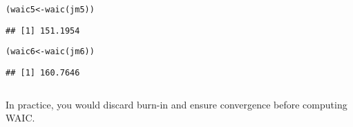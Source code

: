 \documentclass[color=usenames,dvipsnames]{beamer}\usepackage[]{graphicx}\usepackage[]{xcolor}
\makeatletter
\newcommand{\hldef}[1]{\textcolor[rgb]{0,0,0}{#1}}%
\newcommand{\hlkwb}[1]{\textcolor[rgb]{0,0.341,0.682}{#1}}%
\newcommand{\hlkwd}[1]{\textcolor[rgb]{0.004,0.004,0.506}{#1}}%
\newenvironment{kframe}{%
 \def\at@end@of@kframe{}%
 \ifinner\ifhmode%
  \def\at@end@of@kframe{\end{minipage}}%
  \begin{minipage}{\columnwidth}%
 \fi\fi%
 \def\FrameCommand##1{\hskip\@totalleftmargin \hskip-\fboxsep
 \colorbox{shadecolor}{##1}\hskip-\fboxsep
     \hskip-\linewidth \hskip-\@totalleftmargin \hskip\columnwidth}%
 \MakeFramed {\advance\hsize-\width
   \@totalleftmargin\z@ \linewidth\hsize
   \@setminipage}}%
 {\par\unskip\endMakeFramed%
 \at@end@of@kframe}
\newenvironment{knitrout}{}{} %
\makeatother
\begin{document}
\begin{frame}[fragile]
\begin{columns}
\begin{column}{0.5\textwidth}
\begin{knitrout}
\end{knitrout}
\begin{knitrout}\scriptsize
{}\color{fgcolor}\begin{kframe}
\begin{alltt}
\hldef{(waic5} \hlkwb{<-} \hlkwd{waic}\hldef{(jm5))}
\end{alltt}
\begin{verbatim}
## [1] 151.1954
\end{verbatim}
\end{kframe}
\end{knitrout}
\begin{knitrout}\scriptsize
{}\color{fgcolor}\begin{kframe}
\begin{alltt}
\hldef{(waic6} \hlkwb{<-} \hlkwd{waic}\hldef{(jm6))}
\end{alltt}
\begin{verbatim}
## [1] 160.7646
\end{verbatim}
\end{kframe}
\end{knitrout}
    \end{column}
  \end{columns}
  \pause
  \vfill
  In practice, you would discard burn-in and ensure convergence before
  computing WAIC.
\end{frame}
\end{document}
